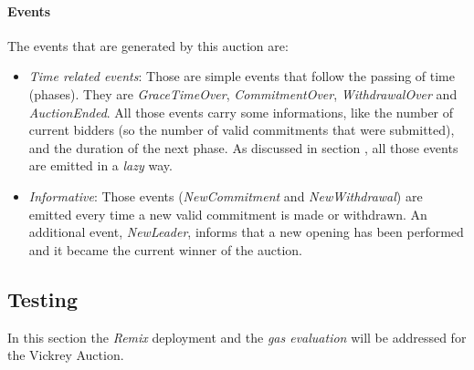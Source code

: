\documentclass[11pt, a4paper]{report}
\begin{document}
	\paragraph*{Events}
	The events that are generated by this auction are:
	\begin{itemize}
		\item \emph{Time related events}: Those are simple events that follow the passing of time (phases). They are \emph{GraceTimeOver}, \emph{CommitmentOver}, \emph{WithdrawalOver} and \emph{AuctionEnded}. All those events carry some informations, like the number of current bidders (so the number of valid commitments that were submitted), and the duration of the next phase. As discussed in section , all those events are emitted in a \emph{lazy} way.
		\item \emph{Informative}: Those events (\emph{NewCommitment} and \emph{NewWithdrawal}) are emitted every time a new valid commitment is made or withdrawn. An additional event, \emph{NewLeader}, informs that a new opening has been performed and it became the current winner of the auction.
	\end{itemize}
	
	\subsection*{Testing}
	In this section the \emph{Remix} deployment and the \emph{gas evaluation} will be addressed for the Vickrey Auction. \\ 

	
\end{document}
